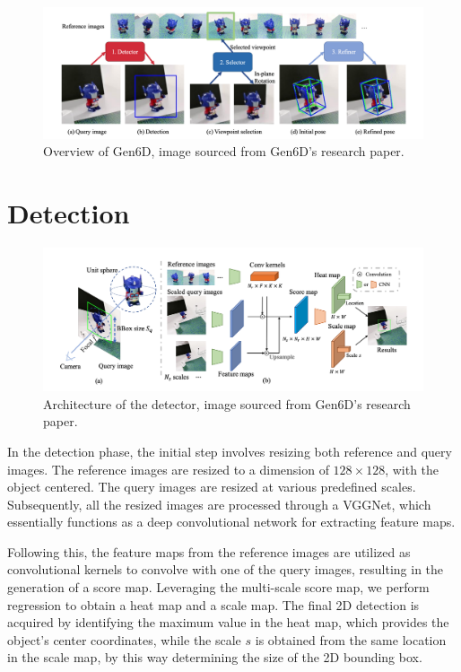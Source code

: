 \bigskip
\bigskip
\bigskip

\begin{figure}[ht]
  \centering
  \includegraphics[width=\textwidth]{data/gen6d1.png}
  \caption{Overview of Gen6D, image sourced from Gen6D's research paper.}
  \label{fig:fig0}
\end{figure}

\cleardoublepage{}

\section{Detection}

\begin{figure}[ht]
  \centering
  \includegraphics[width=\textwidth]{data/gen6d2.png}
  \caption{Architecture of the detector, image sourced from Gen6D's research paper.}
  \label{fig:fig1}
\end{figure}

\bigskip

In the detection phase, the initial step involves resizing both reference and query images. The reference images are resized to a dimension of $128 \times 128$, with the object centered. The query images are resized at various predefined scales. Subsequently, all the resized images are processed through a \ac{VGGNet}, which essentially functions as a deep convolutional network for extracting feature maps.

Following this, the feature maps from the reference images are utilized as convolutional kernels to convolve with one of the query images, resulting in the generation of a score map. Leveraging the multi-scale score map, we perform regression to obtain a heat map and a scale map. The final 2D detection is acquired by identifying the maximum value in the heat map, which provides the object's center coordinates, while the scale $s$ is obtained from the same location in the scale map, by this way determining the size of the 2D bounding box.

